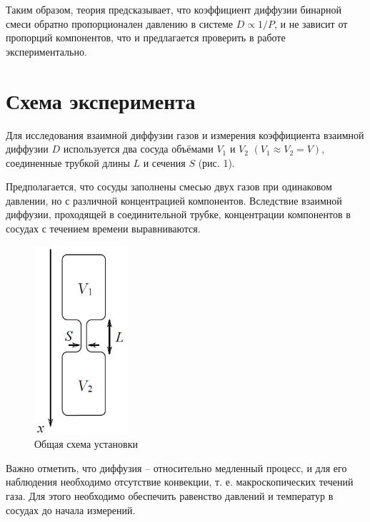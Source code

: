 \documentclass[a4paper,12pt]{article} %
\begin{document}
\medskip

\noindent Таким образом, теория предсказывает, что коэффициент диффузии бинарной смеси обратно пропорционален давлению в системе $ D \propto 1/P $, и не зависит от пропорций компонентов, что и предлагается проверить в работе экспериментально.

\medskip

\section{Схема эксперимента}

\medskip

\noindent Для исследования взаимной диффузии газов и измерения коэффициента взаимной диффузии $ D $ используется два сосуда объёмами $ V_1 $ и $ V_2 $ $ (V_1\approx V_2=V) $, соединенные трубкой длины $ L $ и сечения $ S $ (рис. 1). 

\medskip

\noindent Предполагается, что сосуды заполнены смесью двух газов при одинаковом давлении, но с различной концентрацией компонентов. Вследствие взаимной диффузии, проходящей в соединительной трубке, концентрации компонентов в сосудах с течением времени выравниваются. 

\medskip

\begin{figure}
	\includegraphics[width=3.5cm]{схема.jpg}
	\caption{Общая схема установки}
	\label{ris1}
\end{figure}

\medskip

\noindent Важно отметить, что диффузия -- относительно медленный процесс, и для его наблюдения необходимо отсутствие конвекции, т. е. макроскопических течений газа. Для этого необходимо обеспечить равенство давлений и температур в сосудах до начала измерений.
\end{document}
